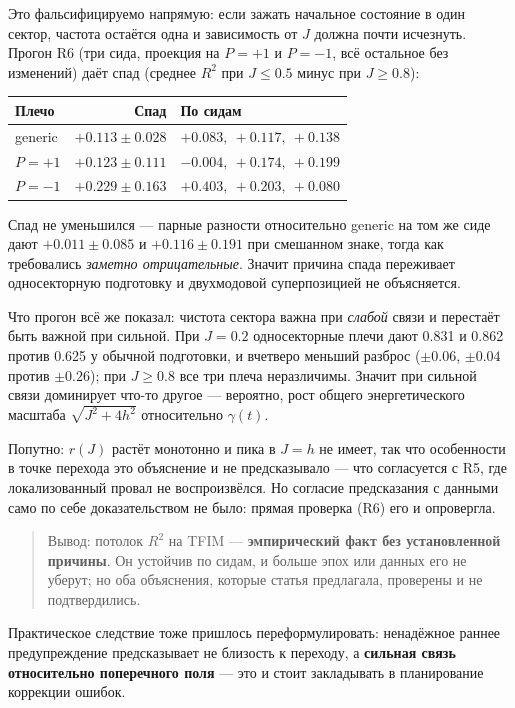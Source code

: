 \documentclass[12pt,a4paper]{article}
\begin{document}
Это фальсифицируемо напрямую: если зажать начальное состояние в один сектор,
частота остаётся одна и зависимость от $J$ должна почти исчезнуть. Прогон R6
(три сида, проекция на $P={+}1$ и $P={-}1$, всё остальное без изменений) даёт
спад (среднее $R^2$ при $J\leq0.5$ минус при $J\geq0.8$):

\begin{center}\small
\begin{tabular}{@{}lrl@{}}
\toprule
Плечо & Спад & По сидам \\
\midrule
generic   & $+0.113 \pm 0.028$ & $+0.083,\ +0.117,\ +0.138$ \\
$P={+}1$  & $+0.123 \pm 0.111$ & $-0.004,\ +0.174,\ +0.199$ \\
$P={-}1$  & $+0.229 \pm 0.163$ & $+0.403,\ +0.203,\ +0.080$ \\
\bottomrule
\end{tabular}
\end{center}

Спад не уменьшился — парные разности относительно generic на том же сиде дают
$+0.011\pm0.085$ и $+0.116\pm0.191$ при смешанном знаке, тогда как требовались
\emph{заметно отрицательные}. Значит причина спада переживает односекторную
подготовку и двухмодовой суперпозицией не объясняется.

Что прогон всё же показал: чистота сектора важна при \emph{слабой} связи и
перестаёт быть важной при сильной. При $J=0.2$ односекторные плечи дают 0.831 и
0.862 против 0.625 у обычной подготовки, и вчетверо меньший разброс
($\pm0.06$, $\pm0.04$ против $\pm0.26$); при $J\geq0.8$ все три плеча
неразличимы. Значит при сильной связи доминирует что-то другое — вероятно, рост
общего энергетического масштаба $\sqrt{J^2+4h^2}$ относительно $\gamma(t)$.

Попутно: $r(J)$ растёт монотонно и пика в $J=h$ не имеет, так что особенности в
точке перехода это объяснение и не предсказывало — что согласуется с R5, где
локализованный провал не воспроизвёлся. Но согласие предсказания с данными само
по себе доказательством не было: прямая проверка (R6) его и опровергла.

\begin{quote}
Вывод: потолок $R^2$ на TFIM — \textbf{эмпирический факт без установленной
причины}. Он устойчив по сидам, и больше эпох или данных его не уберут; но оба
объяснения, которые статья предлагала, проверены и не подтвердились.
\end{quote}

Практическое следствие тоже пришлось переформулировать: ненадёжное раннее
предупреждение предсказывает не близость к переходу, а \textbf{сильная связь
относительно поперечного поля} — это и стоит закладывать в планирование
коррекции ошибок.
\end{document}

